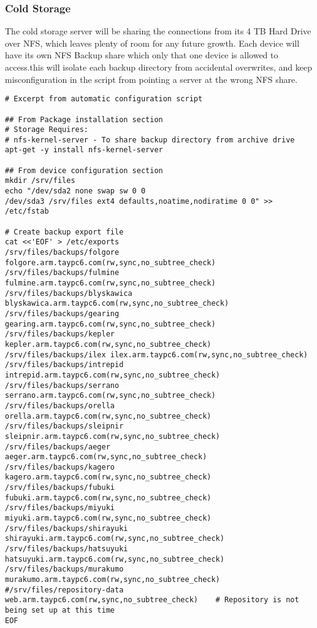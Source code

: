 \documentclass[12pt]{spieman}  %
\begin{document}
\subsubsection{Cold Storage}
\label{subsubsec:cold-config}

The cold storage server will be sharing the connections from its 4 TB Hard Drive over NFS, which leaves plenty of room for any future growth. Each device will have its own NFS Backup share which only that one device is allowed to access.this will isolate each backup directory from accidental overwrites, and keep misconfiguration in the script from pointing a server at the wrong NFS share.

\begin{lstlisting}
# Excerpt from automatic configuration script

## From Package installation section
# Storage Requires:
# nfs-kernel-server - To share backup directory from archive drive
apt-get -y install nfs-kernel-server

## From device configuration section
mkdir /srv/files
echo "/dev/sda2 none swap sw 0 0
/dev/sda3 /srv/files ext4 defaults,noatime,nodiratime 0 0" >> /etc/fstab

# Create backup export file
cat <<'EOF' > /etc/exports
/srv/files/backups/folgore	folgore.arm.taypc6.com(rw,sync,no_subtree_check)
/srv/files/backups/fulmine	fulmine.arm.taypc6.com(rw,sync,no_subtree_check)
/srv/files/backups/blyskawica	blyskawica.arm.taypc6.com(rw,sync,no_subtree_check)
/srv/files/backups/gearing	gearing.arm.taypc6.com(rw,sync,no_subtree_check)
/srv/files/backups/kepler	kepler.arm.taypc6.com(rw,sync,no_subtree_check)
/srv/files/backups/ilex	ilex.arm.taypc6.com(rw,sync,no_subtree_check)
/srv/files/backups/intrepid	intrepid.arm.taypc6.com(rw,sync,no_subtree_check)
/srv/files/backups/serrano	serrano.arm.taypc6.com(rw,sync,no_subtree_check)
/srv/files/backups/orella	orella.arm.taypc6.com(rw,sync,no_subtree_check)
/srv/files/backups/sleipnir	sleipnir.arm.taypc6.com(rw,sync,no_subtree_check)
/srv/files/backups/aeger	aeger.arm.taypc6.com(rw,sync,no_subtree_check)
/srv/files/backups/kagero	kagero.arm.taypc6.com(rw,sync,no_subtree_check)
/srv/files/backups/fubuki	fubuki.arm.taypc6.com(rw,sync,no_subtree_check)
/srv/files/backups/miyuki	miyuki.arm.taypc6.com(rw,sync,no_subtree_check)
/srv/files/backups/shirayuki	shirayuki.arm.taypc6.com(rw,sync,no_subtree_check)
/srv/files/backups/hatsuyuki	hatsuyuki.arm.taypc6.com(rw,sync,no_subtree_check)
/srv/files/backups/murakumo	murakumo.arm.taypc6.com(rw,sync,no_subtree_check)
#/srv/files/repository-data	web.arm.taypc6.com(rw,sync,no_subtree_check)	# Repository is not being set up at this time
EOF


\end{lstlisting}
\end{document}
